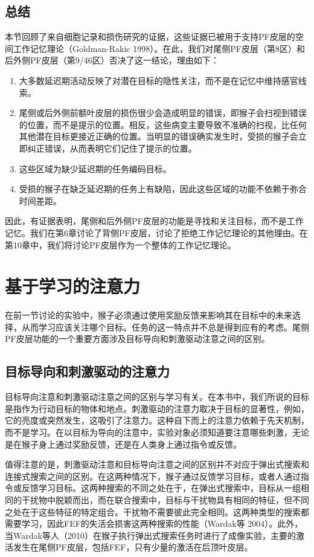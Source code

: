 \subsection{总结}
本节回顾了来自细胞记录和损伤研究的证据，这些证据已被用于支持PF皮层的空间工作记忆理论（Goldman-Rakic 1998）。在此，我们对尾侧PF皮层（第8区）和后外侧PF皮层（第9/46区）否决了这一结论，理由如下：
\begin{enumerate}
	\item 大多数延迟期活动反映了对潜在目标的隐性关注，而不是在记忆中维持感官线索。
	\item 尾侧或后外侧前额叶皮层的损伤很少会造成明显的错误，即猴子会扫视到错误的位置，而不是提示的位置。相反，这些病变主要导致不准确的扫视，比任何其他潜在目标更接近正确的位置。当明显的错误确实发生时，受损的猴子会立即纠正错误，从而表明它们记住了提示的位置。
	\item 这些区域为缺少延迟期的任务编码目标。
	\item 受损的猴子在缺乏延迟期的任务上有缺陷，因此这些区域的功能不依赖于弥合时间差距。
\end{enumerate}
因此，有证据表明，尾侧和后外侧PF皮层的功能是寻找和关注目标，而不是工作记忆。我们在第6章讨论了背侧PF皮层，讨论了拒绝工作记忆理论的其他理由。在第10章中，我们将讨论PF皮层作为一个整体的工作记忆理论。
\section{基于学习的注意力}
在前一节讨论的实验中，猴子必须通过使用奖励反馈来影响其在目标中的未来选择，从而学习应该关注哪个目标。任务的这一特点并不总是得到应有的考虑。尾侧PF皮层功能的一个重要方面涉及目标导向和刺激驱动注意之间的区别。
\subsection{目标导向和刺激驱动的注意力}
目标导向注意和刺激驱动注意之间的区别与学习有关。在本书中，我们所说的目标是指作为行动目标的物体和地点。刺激驱动的注意力取决于目标的显著性，例如，它的亮度或突然发生，这吸引了注意力。这种自下而上的注意力依赖于先天机制，而不是学习。在以目标为导向的注意中，实验对象必须知道要注意哪些刺激，无论是在猴子身上通过奖励反馈，还是在人类身上通过指令或反馈。

值得注意的是，刺激驱动注意和目标导向注意之间的区别并不对应于弹出式搜索和连接式搜索之间的区别。在这两种情况下，猴子通过反馈学习目标，或者人通过指令或反馈学习目标。这两种搜索的不同之处在于，在弹出式搜索中，目标从一组相同的干扰物中脱颖而出，而在联合搜索中，目标与干扰物具有相同的特征，但不同之处在于这些特征的特定组合。干扰物不需要彼此完全相同。这两种类型的搜索都需要学习，因此FEF的失活会损害这两种搜索的性能（Wardak等 2004）。此外，当Wardak等人（2010）在猴子执行弹出式搜索任务时进行了成像实验，主要的激活发生在尾侧PF皮层，包括FEF，只有少量的激活在后顶叶皮层。

